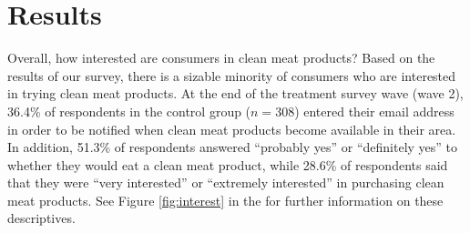 \documentclass[12pt]{article}
\newcommand{\todo}[1]{\textit{\textcolor{red}{$<$todo$>$ #1 $<$/todo$>$}}}
\begin{document}


\section{Results}
\label{sec:results}



Overall, how interested are consumers in clean meat products? Based on the results of our survey, there is a sizable minority of consumers who are interested in trying clean meat products. At the end of the treatment survey wave (wave 2), 36.4\% of respondents in the control group ($n=308$) entered their email address in order to be notified when clean meat products become available in their area. In addition, 51.3\% of respondents answered ``probably yes'' or ``definitely yes'' to whether they would eat a clean meat product, while 28.6\% of respondents said that they were ``very interested'' or ``extremely interested'' in purchasing clean meat products. See Figure \ref{fig:interest} in the  for further information on these descriptives.
\end{document}
